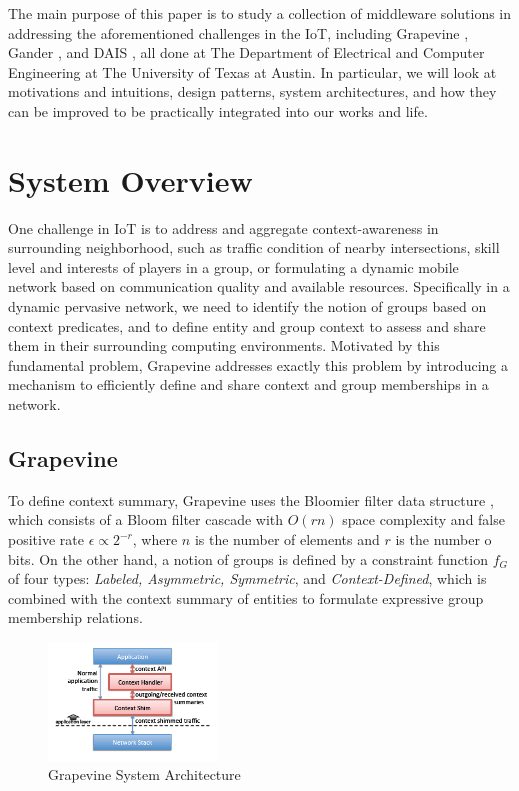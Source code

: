 \documentclass[11pt,onecolumn]{article}
\begin{document}
The main purpose of this paper is to study a collection of middleware solutions in addressing the aforementioned challenges in the IoT, including Grapevine \cite{grapevine}, Gander \cite{michel2013gander}, and DAIS \cite{dais}, all done at The Department of Electrical and Computer Engineering at The University of Texas at Austin. In particular, we will look at motivations and intuitions, design patterns, system architectures, and how they can be improved to be practically integrated into our works and life.

\section{System Overview}
One challenge in IoT is to address and aggregate context-awareness in surrounding neighborhood, such as traffic condition of nearby intersections, skill level and interests of players in a group, or formulating a dynamic mobile network based on communication quality and available resources. Specifically in a dynamic pervasive network, we need to identify the notion of groups based on context predicates, and to define entity and group context to assess and share them in their surrounding computing environments.  Motivated by this fundamental problem, Grapevine \cite{grapevine} addresses exactly this problem by introducing a mechanism to efficiently define and share context and group memberships in a network.

\subsection{Grapevine}

To define context summary, Grapevine uses the Bloomier filter data structure \cite{chazelle2004bloomier}, which consists of a Bloom filter cascade with $O(rn)$ space complexity and false positive rate $\epsilon \propto 2^{-r}$, where $n$ is the number of elements and $r$ is the number o bits. On the other hand, a notion of groups is defined by a constraint function $f_G$ of four types: {\em Labeled, Asymmetric, Symmetric}, and {\em Context-Defined}, which is combined with the context summary of entities to formulate expressive group membership relations.

\begin{figure}
\vspace{-20pt}
  \begin{center}
    \includegraphics[width=0.4\textwidth]{resources/grapevine_architecture.png}
  \end{center}
\vspace{-20pt}
  \caption{Grapevine System Architecture \cite{grapevine} \label{grapevine_architecture}}
\end{figure}
\end{document}
